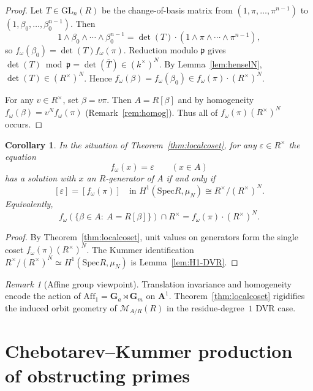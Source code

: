 \documentclass[11pt,letterpaper]{amsart}
\newcommand{\A}{\mathbf{A}}
\newcommand{\Gm}{\mathbf{G}_m}
\newcommand{\Ga}{\mathbf{G}_a}
\newcommand{\Spec}{\mathrm{Spec}}
\newcommand{\cM}{\mathcal{M}}
\newcommand{\Aff}{\mathrm{Aff}}
\theoremstyle{plain}
\newtheorem{corollary}[theorem]{Corollary}
\theoremstyle{definition}
\theoremstyle{remark}
\newtheorem{remark}[theorem]{Remark}
\theoremstyle{plain}
\begin{document}
\begin{proof}
Let $T\in\mathrm{GL}_n(R)$ be the change-of-basis matrix from $(1,\pi,\dots,\pi^{n-1})$ to $(1,\beta_0,\dots,\beta_0^{n-1})$.
Then
\[
1\wedge \beta_0\wedge\cdots\wedge \beta_0^{n-1} = \det(T)\cdot (1\wedge \pi\wedge\cdots\wedge\pi^{n-1}),
\]
so $f_\omega(\beta_0)=\det(T)f_\omega(\pi)$.
Reduction modulo $\mathfrak p$ gives $\det(T)\bmod\mathfrak p=\det(\bar T)\in (k^\times)^N$.
By Lemma~\ref{lem:henselN}, $\det(T)\in (R^\times)^N$.
Hence $f_\omega(\beta)=f_\omega(\beta_0)\in f_\omega(\pi)\cdot (R^\times)^N$.


For any $v\in R^\times$, set $\beta=v\pi$. Then $A=R[\beta]$ and by homogeneity
$f_\omega(\beta)=v^N f_\omega(\pi)$ (Remark~\ref{rem:homog}).
Thus all of $f_\omega(\pi)(R^\times)^N$ occurs.
\end{proof}


\begin{corollary}\label{cor:local-solv-kummer}
In the situation of Theorem~\ref{thm:localcoset}, for any $\varepsilon\in R^\times$ the equation
\[
f_\omega(x)=\varepsilon \qquad (x\in A)
\]
has a solution with $x$ an $R$-generator of $A$ if and only if
\[
[\varepsilon]=[f_\omega(\pi)] \quad \text{in } H^1(\Spec R,\mu_N)\cong R^\times/(R^\times)^N.
\]
Equivalently,
\[
f_\omega(\{\beta\in A:\ A=R[\beta]\})\cap R^\times = f_\omega(\pi)\cdot (R^\times)^N.
\]
\end{corollary}

\begin{proof}
By Theorem~\ref{thm:localcoset}, unit values on generators form the single coset $f_\omega(\pi)(R^\times)^N$.
The Kummer identification $R^\times/(R^\times)^N\simeq H^1(\Spec R,\mu_N)$ is Lemma~\ref{lem:H1-DVR}.
\end{proof}

\begin{remark}[Affine group viewpoint]
Translation invariance and homogeneity encode the action of $\Aff_1=\Ga\rtimes\Gm$ on $\A^1$.
Theorem~\ref{thm:localcoset} rigidifies the induced orbit geometry of $\cM_{A/R}(R)$ in the residue-degree~$1$ DVR case.
\end{remark}



\section{Chebotarev--Kummer production of obstructing primes}
\label{sec:chebotarev-kummer}
\end{document}
